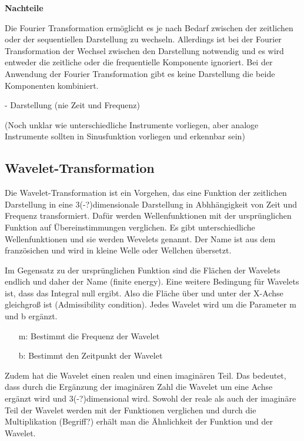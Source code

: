 %
\textbf{Nachteile}
%
    
Die Fourier Transformation ermöglicht es je nach Bedarf zwischen der zeitlichen oder der sequentiellen Darstellung zu wechseln. Allerdings ist bei der Fourier Transformation der Wechsel zwischen den Darstellung notwendig und es wird entweder die zeitliche oder die frequentielle Komponente ignoriert. Bei der Anwendung der Fourier Transformation gibt es keine Darstellung die beide Komponenten kombiniert.

    - Darstellung (nie Zeit und Frequenz)

(Noch unklar wie unterschiedliche Instrumente vorliegen, aber analoge Instrumente sollten in Sinusfunktion vorliegen und erkennbar sein)

%
\subsection{Wavelet-Transformation}
%

Die Wavelet-Transformation ist ein Vorgehen, das eine Funktion der zeitlichen Darstellung in eine 3(-?)dimensionale Darstellung in Abhhängigkeit von Zeit und Frequenz transformiert. Dafür werden Wellenfunktionen mit der ursprünglichen Funktion auf Übereinstimmungen verglichen. Es gibt unterschiedliche Wellenfunktionen und sie werden Wevelets genannt. Der Name ist aus dem französichen und wird in kleine Welle oder Wellchen übersetzt.

\par

Im Gegensatz zu der ursprünglichen Funktion sind die Flächen der Wavelets endlich und daher der Name (finite energy). Eine weitere Bedingung für Wavelets ist, dass das Integral null ergibt. Also die Fläche über und unter der X-Achse gleichgroß ist (Admissibility condition). Jedes Wavelet wird um die Parameter m und b ergänzt.

%
\begin{itemize}
    \item[m:] Bestimmt die Frequenz der Wavelet
    \item[b:] Bestimmt den Zeitpunkt der Wavelet
\end{itemize}
%

Zudem hat die Wavelet einen realen und einen imaginären Teil. Das bedeutet, dass durch die Ergänzung der imaginären Zahl die Wavelet um eine Achse ergänzt wird und 3(-?)dimensional wird. Sowohl der reale als auch der imaginäre Teil der Wavelet werden mit der Funktionen verglichen und durch die Multiplikation (Begriff?) erhält man die Ähnlichkeit der Funktion und der Wavelet.

